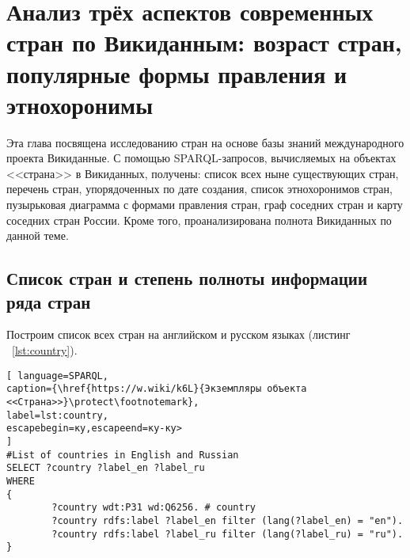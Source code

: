 \chapter[Анализ стран: возраст, формы правления и этнохоронимы]{Анализ трёх аспектов современных стран по Викиданным: возраст стран, популярные формы правления и этнохоронимы}
\label{ch:country}

Эта глава посвящена исследованию стран на основе базы знаний международного проекта Викиданные. С помощью SPARQL-запросов, вычисляемых на объектах <<страна>> в Викиданных, получены: список всех ныне существующих стран, перечень стран, упорядоченных по дате создания, список этнохоронимов стран, пузырьковая диаграмма с формами правления стран, граф соседних стран и карту соседних стран России. Кроме того, проанализирована полнота Викиданных по данной теме.

\begin{marginfigure}[0.0cm]
	{
		\setlength{\fboxsep}{0pt}%
		\setlength{\fboxrule}{1pt}%
	}
	\caption{
		Высокая степень заполнения по числу свойств объекта Викиданных \href{https://www.wikidata.org/wiki/Q6256}{Страна (Q6256)}.  Данные получены с помощью сервиса \href{https://prowd.id/dashboards/86b6f91a8131/profile}{ProWD.id}, 2020 год. \emph{Коэффициент Джини равен 0.091.}
	}%
	\label{fig:ProWD_country}%
\end{marginfigure}


\section{Список стран и степень полноты информации ряда стран}

Построим список всех стран на английском и русском языках (листинг ~\ref{lst:country}).

\begin{lstlisting}[ language=SPARQL, 
caption={\href{https://w.wiki/k6L}{Экземпляры объекта <<Страна>>}\protect\footnotemark},
label=lst:country, 
escapebegin=ку,escapeend=ку-ку>
]
#List of countries in English and Russian
SELECT ?country ?label_en ?label_ru
WHERE
{
		?country wdt:P31 wd:Q6256. # country
		?country rdfs:label ?label_en filter (lang(?label_en) = "en").
		?country rdfs:label ?label_ru filter (lang(?label_ru) = "ru").
}
\end{lstlisting}


